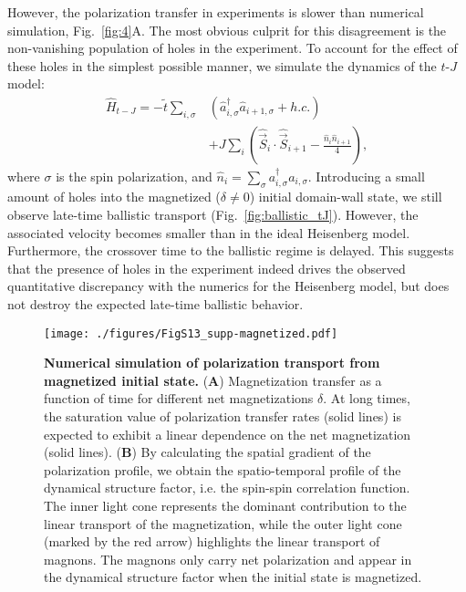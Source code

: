 \documentclass[
 reprint,
 superscriptaddress,
 amsmath,amssymb,
 aps,
 pra,
]{revtex4-2}
\begin{document}
However, the polarization transfer in experiments is slower than numerical simulation, Fig.~\ref{fig:4}A. The most obvious culprit for this disagreement is the non-vanishing population of holes in the experiment.
To account for the effect of these holes in the simplest possible manner, we simulate the dynamics of the $t$-$J$ model:
\begin{equation}
\begin{split}
    \hat{H}_{t-J}=-\tilde{t}\sum_{i,\sigma}&(\hat{a}^\dag_{i,\sigma} \hat{a}_{i+1,\sigma}+h.c.)\\
    &+J\sum_i\left(\hat{\vec{S}}_i \cdot \hat{\vec{S}}_{i+1}-\frac{\hat{n}_i \hat{n}_{i+1}}{4}\right),
\end{split}
    \label{eq:t-J_Hamiltonian}
\end{equation}
where $\sigma$ is the spin polarization, and $\hat{n}_i=\sum_\sigma a^\dag_{i,\sigma}a_{i,\sigma}$. 
Introducing a small amount of holes into the magnetized ($\delta\neq 0$) initial domain-wall state, we still observe late-time ballistic transport (Fig.~\ref{fig:ballistic_tJ}). 
However, the associated velocity becomes smaller than in the ideal Heisenberg model. 
Furthermore, the crossover time to the ballistic regime is delayed. 
This suggests that the presence of holes in the experiment indeed drives the observed quantitative discrepancy with the numerics for the Heisenberg model, but does not destroy the expected late-time ballistic behavior.

\begin{figure*}[t!]
    \centering
    \texttt{[image: ./figures/FigS13\_supp-magnetized.pdf]}
    \caption{\textbf{Numerical simulation of polarization transport from magnetized initial state.}
        (\textbf{A})  Magnetization transfer as a function of time for different net magnetizations $\delta$. At long times, the saturation value of polarization transfer rates (solid lines) is expected to exhibit a linear dependence on the net magnetization (solid lines).
        (\textbf{B}) By calculating the spatial gradient of the polarization profile, we obtain the spatio-temporal profile of the dynamical structure factor, i.e. the spin-spin correlation function. The inner light cone represents the dominant contribution to the linear transport of the magnetization, while the outer light cone (marked by the red arrow) highlights the linear transport of magnons.
        The magnons only carry net polarization and appear in the dynamical structure factor when the initial state is magnetized.
    }
    \label{fig:num-vary-mag}
\end{figure*}
\end{document}

